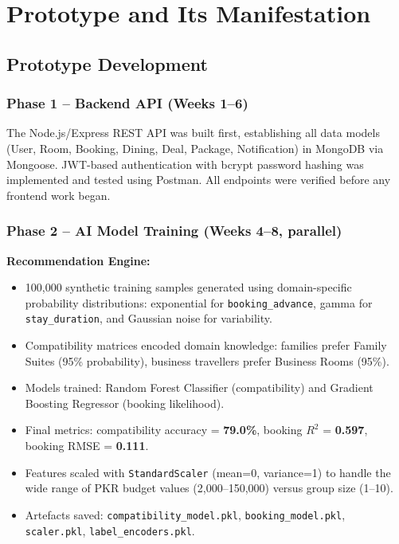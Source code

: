 \documentclass[12pt,a4paper]{report}
\begin{document}
\chapter{Prototype and Its Manifestation}

\section{Prototype Development}

\subsection*{Phase 1 -- Backend API (Weeks 1--6)}
The Node.js/Express REST API was built first, establishing all data models (User, Room, Booking, Dining, Deal, Package, Notification) in MongoDB via Mongoose. JWT-based authentication with bcrypt password hashing was implemented and tested using Postman. All endpoints were verified before any frontend work began.

\subsection*{Phase 2 -- AI Model Training (Weeks 4--8, parallel)}
\textbf{Recommendation Engine:}
\begin{itemize}[leftmargin=*, label=\textbullet]
  \item 100,000 synthetic training samples generated using domain-specific probability distributions: exponential for \texttt{booking\_advance}, gamma for \texttt{stay\_duration}, and Gaussian noise for variability.
  \item Compatibility matrices encoded domain knowledge: families prefer Family Suites (95\% probability), business travellers prefer Business Rooms (95\%).
  \item Models trained: Random Forest Classifier (compatibility) and Gradient Boosting Regressor (booking likelihood).
  \item Final metrics: compatibility accuracy = \textbf{79.0\%}, booking $R^2$ = \textbf{0.597}, booking RMSE = \textbf{0.111}.
  \item Features scaled with \texttt{StandardScaler} (mean=0, variance=1) to handle the wide range of PKR budget values (2,000--150,000) versus group size (1--10).
  \item Artefacts saved: \texttt{compatibility\_model.pkl}, \texttt{booking\_model.pkl}, \texttt{scaler.pkl}, \texttt{label\_encoders.pkl}.
\end{itemize}
\end{document}

